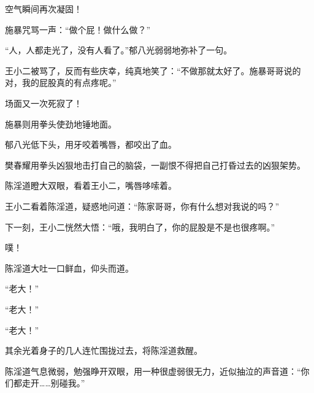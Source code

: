 \begin{this_body}
空气瞬间再次凝固！

施暴咒骂一声：“做个屁！做什么做？”

“人，人都走光了，没有人看了。”郁八光弱弱地弥补了一句。

王小二被骂了，反而有些庆幸，纯真地笑了：“不做那就太好了。施暴哥哥说的对，我的屁股真的有点疼呢。”

场面又一次死寂了！

施暴则用拳头使劲地锤地面。

郁八光低下头，用牙咬着嘴唇，都咬出了血。

樊春耀用拳头凶狠地击打自己的脑袋，一副恨不得把自己打昏过去的凶狠架势。

陈淫道瞪大双眼，看着王小二，嘴唇哆嗦着。

王小二看着陈淫道，疑惑地问道：“陈家哥哥，你有什么想对我说的吗？”

下一刻，王小二恍然大悟：“哦，我明白了，你的屁股是不是也很疼啊。”

噗！

陈淫道大吐一口鲜血，仰头而道。

“老大！”

“老大！”

“老大！”

其余光着身子的几人连忙围拢过去，将陈淫道救醒。

陈淫道气息微弱，勉强睁开双眼，用一种很虚弱很无力，近似抽泣的声音道：“你们都走开……别碰我。”

\end{this_body}


